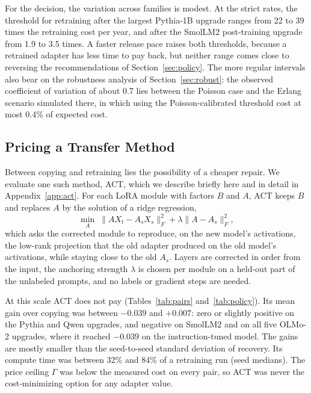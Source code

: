 \documentclass[ijds,blindrev]{informs4}
\begin{document}
For the decision, the variation across families is modest. At the strict rates, the threshold for retraining after the largest Pythia-1B upgrade ranges from 22 to 39 times the retraining cost per year, and after the SmolLM2 post-training upgrade from 1.9 to 3.5 times. A faster release pace raises both thresholds, because a retrained adapter has less time to pay back, but neither range comes close to reversing the recommendations of Section~\ref{sec:policy}. The more regular intervals also bear on the robustness analysis of Section~\ref{sec:robust}: the observed coefficient of variation of about 0.7 lies between the Poisson case and the Erlang scenario simulated there, in which using the Poisson-calibrated threshold cost at most 0.4\% of expected cost.

\subsection{Pricing a Transfer Method}\label{sec:act-results}

Between copying and retraining lies the possibility of a cheaper repair. We evaluate one such method, ACT, which we describe briefly here and in detail in Appendix~\ref{app:act}. For each LoRA module with factors $B$ and $A$, ACT keeps $B$ and replaces $A$ by the solution of a ridge regression,
\begin{equation}\label{eq:act}
\min_{A}\;\|AX_t-A_sX_s\|_F^2+\lambda\|A-A_s\|_F^2,
\end{equation}
which asks the corrected module to reproduce, on the new model's activations, the low-rank projection that the old adapter produced on the old model's activations, while staying close to the old $A_s$. Layers are corrected in order from the input, the anchoring strength $\lambda$ is chosen per module on a held-out part of the unlabeled prompts, and no labels or gradient steps are needed.

At this scale ACT does not pay (Tables~\ref{tab:pairs} and~\ref{tab:policy}). Its mean gain over copying was between $-0.039$ and $+0.007$: zero or slightly positive on the Pythia and Qwen upgrades, and negative on SmolLM2 and on all five OLMo-2 upgrades, where it reached $-0.039$ on the instruction-tuned model. The gains are mostly smaller than the seed-to-seed standard deviation of recovery. Its compute time was between 32\% and 84\% of a retraining run (seed medians). The price ceiling $\Gamma$ was below the measured cost on every pair, so ACT was never the cost-minimizing option for any adapter value.
\end{document}
